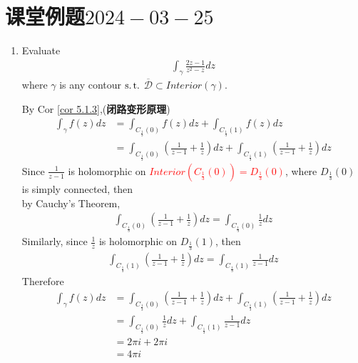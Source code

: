 \section{课堂例题$2024-03-25$}
	\begin{enumerate}
		\item Evaluate 
		\begin{align}
			\int_{\gamma}{\frac{2z - 1}{z^2 - z} dz}
		\end{align}
		where $\gamma$ is any contour $\operatorname{s.t.}$ $\overline{\mathcal{D}} \subset Interior(\gamma)$.
		
		\vspace{2em}
		\begin{solution}
			By Cor \ref{cor 5.1.3},(\textbf{闭路变形原理})
			\begin{align}
				\int_{\gamma}{f(z) dz} 
				&= \int_{C_{\frac{1}{3}}(0)}{f(z) dz} + \int_{C_{\frac{1}{3}}(1)}{f(z) dz} \\
				&= \int_{C_{\frac{1}{3}}(0)}{(\frac{1}{z - 1} + \frac{1}{z}) dz} + \int_{C_{\frac{1}{3}}(1)}{(\frac{1}{z - 1} + \frac{1}{z}) dz}
			\end{align}
			Since $\frac{1}{z - 1}$ is holomorphic on \textcolor{red}{$Interior(C_{\frac{1}{3}}(0)) = D_{\frac{1}{3}}(0)$}, where $D_{\frac{1}{3}}(0)$ is simply connected, then \\
			by Cauchy's Theorem,
			\begin{align}
				\int_{C_{\frac{1}{3}}(0)}{(\frac{1}{z - 1} + \frac{1}{z}) dz} = \int_{C_{\frac{1}{3}}(0)}{\frac{1}{z} dz}
			\end{align}
			Similarly, since $\frac{1}{z}$ is holomorphic on $D_{\frac{1}{3}}(1)$, then
			\begin{align}
				\int_{C_{\frac{1}{3}}(1)}{(\frac{1}{z - 1} + \frac{1}{z}) dz} = \int_{C_{\frac{1}{3}}(1)}{\frac{1}{z - 1} dz}
			\end{align}
			Therefore
			\begin{align}
				\int_{\gamma}{f(z) dz} 
				&= \int_{C_{\frac{1}{3}}(0)}{(\frac{1}{z - 1} + \frac{1}{z}) dz} + \int_{C_{\frac{1}{3}}(1)}{(\frac{1}{z - 1} + \frac{1}{z}) dz} \\
				&= \int_{C_{\frac{1}{3}}(0)}{\frac{1}{z} dz} + \int_{C_{\frac{1}{3}}(1)}{\frac{1}{z - 1} dz} \\
				&= 2\pi i + 2\pi i \\
				&= 4 \pi i
			\end{align}
		\end{solution}
		
		\newpage
		

\end{enumerate}
